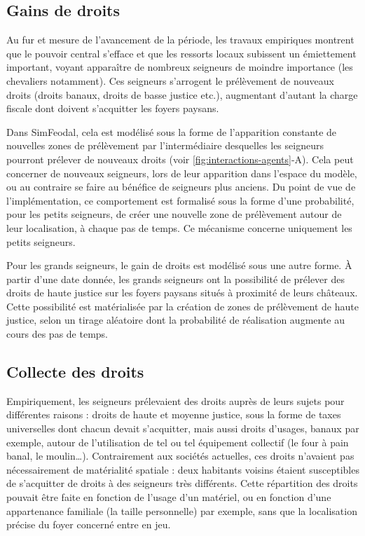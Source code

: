 \subsection{Gains de droits}

Au fur et mesure de l'avancement de la période, les travaux empiriques montrent que le pouvoir central s'efface et que les ressorts locaux subissent un émiettement important, voyant apparaître de nombreux seigneurs de moindre importance (les chevaliers notamment).
Ces seigneurs s'arrogent le prélèvement de nouveaux droits (droits banaux, droits de basse justice etc.), augmentant d'autant la charge fiscale dont doivent s'acquitter les foyers paysans.


\begin{tcolorbox}[breakable,left=0pt,right=0pt,top=0pt,bottom=0pt,
	colback=gray!15,colframe=gray!15,width=\dimexpr\textwidth\relax, 
	enlarge left by=0mm, boxsep=5pt,arc=0pt,outer arc=0pt]
Dans SimFeodal, cela est modélisé sous la forme de l'apparition constante de nouvelles zones de prélèvement par l'intermédiaire desquelles les seigneurs pourront prélever de nouveaux droits (voir \cref{fig:interactions-agents}-A).
Cela peut concerner de nouveaux seigneurs, lors de leur apparition dans l'espace du modèle, ou au contraire se faire au bénéfice de seigneurs plus anciens.
Du point de vue de l'implémentation, ce comportement est formalisé sous la forme d'une probabilité, pour les petits seigneurs, de créer une nouvelle zone de prélèvement autour de leur localisation, à chaque pas de temps.
Ce mécanisme concerne uniquement les petits seigneurs.

\medskip
Pour les grands seigneurs, le gain de droits est modélisé sous une autre forme.
À partir d'une date donnée, les grands seigneurs ont la possibilité de prélever des droits de haute justice sur les foyers paysans situés à proximité de leurs châteaux.
Cette possibilité est matérialisée par la création de zones de prélèvement de haute justice, selon un tirage aléatoire dont la probabilité de réalisation augmente au cours des pas de temps.
\end{tcolorbox}

\subsection{Collecte des droits}

Empiriquement, les seigneurs prélevaient des droits auprès de leurs sujets pour différentes raisons : droits de haute et moyenne justice, sous la forme de taxes universelles dont chacun devait s'acquitter, mais aussi droits d'usages, banaux par exemple, autour de l'utilisation de tel ou tel équipement collectif (le four à pain banal, le moulin\ldots).
Contrairement aux sociétés actuelles, ces droits n'avaient pas nécessairement de matérialité spatiale : deux habitants voisins étaient susceptibles de s'acquitter de droits à des seigneurs très différents.
Cette répartition des droits pouvait être faite en fonction de l'usage d'un matériel, ou en fonction d'une appartenance familiale (la \og taille\fg{} personnelle) par exemple, sans que la localisation précise du foyer concerné entre en jeu.

